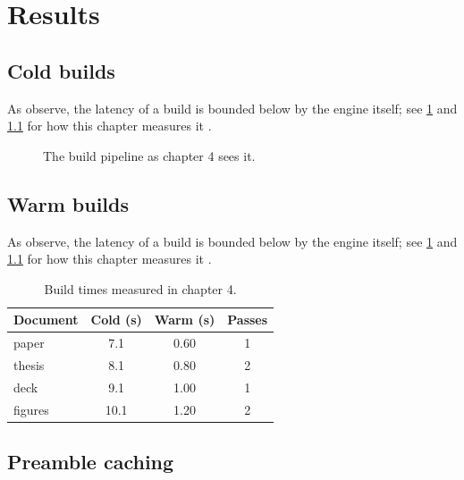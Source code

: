 \chapter{Results}\label{ch:results}

\section{Cold builds}\label{sec:results-0}
\lipsum[33-46]

As \textcite{nielsen1993} observe, the latency \latency{} of a build is
bounded below by the engine itself; see \cref{ch:results} and \cref{fig:results}
for how this chapter measures it \parencite{tectonic2024}.

\begin{figure}[t]
  \centering
  \caption{The build pipeline as chapter 4 sees it.}\label{fig:results}
\end{figure}

\section{Warm builds}\label{sec:results-1}
\lipsum[47-60]

As \textcite{tectonic2024} observe, the latency \latency{} of a build is
bounded below by the engine itself; see \cref{ch:results} and \cref{fig:results}
for how this chapter measures it \parencite{kleppmann2019}.

\begin{table}[t]
  \centering
  \begin{tabular}{lSSS}
    \toprule
    Document & {Cold (s)} & {Warm (s)} & {Passes} \\
    \midrule
    paper & 7.1 & 0.60 & 1 \\
    thesis & 8.1 & 0.80 & 2 \\
    deck & 9.1 & 1.00 & 1 \\
    figures & 10.1 & 1.20 & 2 \\
    \bottomrule
  \end{tabular}
  \caption{Build times measured in chapter 4.}\label{tab:results}
\end{table}

\section{Preamble caching}\label{sec:results-2}
\lipsum[61-74]

